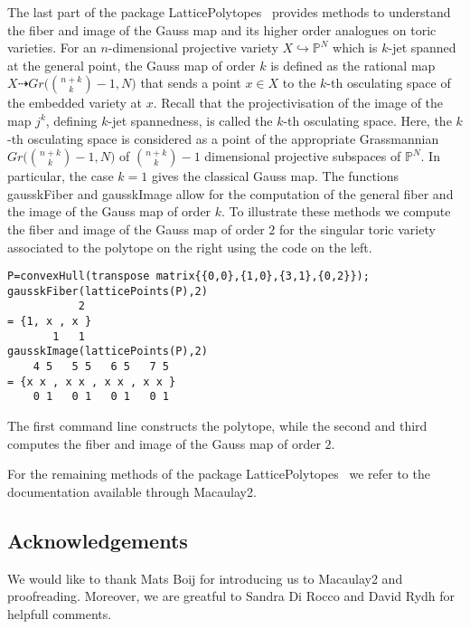 \documentclass{amsart}
\begin{document}
The last part of the package {\textsf{LatticePolytopes}\ } provides methods to understand the fiber and image of the Gauss map and its higher order analogues on toric varieties. For an $n$-dimensional projective variety $X\hookrightarrow {\mathbb{P}}^N$ which is $k$-jet spanned at the general point, the Gauss map of order $k$ is defined as the rational map $X\dashrightarrow Gr\bigl(\binom{n+k}{k}-1,N\bigr)$ that sends a point $x\in X$ to the $k$-th osculating space of the embedded variety at $x$. Recall that the projectivisation of the image of the map $j^k$, defining $k$-jet spannedness, is called the $k$-th osculating space. Here, the $k$-th osculating space is considered as a point of the appropriate Grassmannian $Gr\bigl(\binom{n+k}{k}-1,N\bigr)$ of $\binom{n+k}{k}-1$ dimensional projective subspaces of ${\mathbb{P}}^N$. In particular, the case $k=1$ gives the classical Gauss map. The functions \textsf{gausskFiber} and \textsf{gausskImage} allow for the computation of the general fiber and the image of the Gauss map of order $k$. To illustrate these methods we compute the fiber and image of the Gauss map of order $2$ for the singular toric variety associated to the polytope on the right using the code on the left.\newline 

\begin{minipage}{0.58\linewidth}
\begin{verbatim}
P=convexHull(transpose matrix{{0,0},{1,0},{3,1},{0,2}});
gausskFiber(latticePoints(P),2)
           2
= {1, x , x }
       1   1
gausskImage(latticePoints(P),2)
    4 5   5 5   6 5   7 5
= {x x , x x , x x , x x }
    0 1   0 1   0 1   0 1
\end{verbatim}
\end{minipage}
\begin{minipage}{0.2\linewidth}

\end{minipage}\newline
The first command line constructs the polytope, while the second and third computes the fiber and image of the Gauss map of order $2$. 

For the remaining methods of the package {\textsf{LatticePolytopes}\ } we refer to the documentation available through \textsf{Macaulay2}.

\subsection*{Acknowledgements}
We would like to thank Mats Boij for introducing us to Macaulay2 and proofreading. Moreover, we are greatful to Sandra Di Rocco and David Rydh for helpfull comments.


\end{document}
